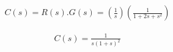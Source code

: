 \item
%



\begin{multline}
C(s) = R(s).G(s) = (\frac{1}{s})  (\frac{1}{1+2s+s^2})
\end{multline}

\begin{multline}
C(s) =  \frac{1}{s(1+s)^2}
\end{multline}

    
